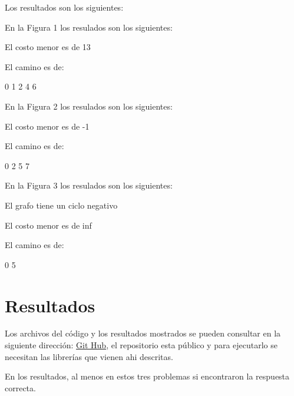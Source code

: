 \documentclass{report}
\begin{document}
\newpage
Los resultados son los siguientes: 

\begin{minipage}[b]{0.3\linewidth}

En la Figura 1 los resulados  son los siguientes:

El costo menor es de 13

El camino es de: 

0 1 2 4 6 
  \end{minipage}
  \hspace{0.5cm}
\begin{minipage}[b]{0.3\linewidth}
En la Figura 2 los resulados  son los siguientes:


  El costo menor es de -1

El camino es de: 

0 2 5 7 
\end{minipage}
\hspace{0.5cm}
\begin{minipage}[b]{0.3\linewidth}
En la Figura 3 los  resulados  son los siguientes:

  El grafo tiene un ciclo  negativo 

El costo menor es de inf 

El camino es de: 

0 5 
  \end{minipage}

\section*{Resultados}

Los archivos del código y los resultados mostrados se pueden consultar en la siguiente dirección: \href{https://github.com/arnoldae9/redes.git}{Git Hub}, el repositorio esta público y para ejecutarlo se necesitan las librerías que vienen ahi descritas.

En los resultados, al menos en estos tres problemas si encontraron la respuesta correcta.
\end{document}
